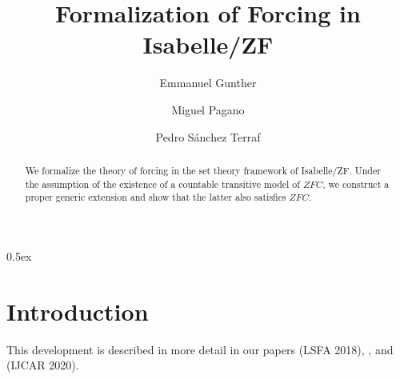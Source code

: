 \documentclass[11pt,a4paper]{article}
\newcommand{\axiomas}[1]{\mathit{#1}}
\newcommand{\ZFC}{\axiomas{ZFC}}
\begin{document}
\title{Formalization of Forcing in Isabelle/ZF}
\author{Emmanuel Gunther
  \and 
  Miguel Pagano
  \and 
  Pedro S\'anchez Terraf
}
\maketitle

\begin{abstract}
We formalize the theory of forcing in the set theory framework of
Isabelle/ZF. Under the assumption of the existence of a countable
transitive model of $\ZFC$, we construct a proper generic extension and show
that the latter also satisfies $\ZFC$.
\end{abstract}


\tableofcontents

\parindent 0pt\parskip 0.5ex

\section{Introduction}
This development is described in more detail in our papers
\cite{2018arXiv180705174G} (LSFA 2018), \cite{2019arXiv190103313G},
and \cite{2020arXiv200109715G} (IJCAR 2020).





\end{document}
